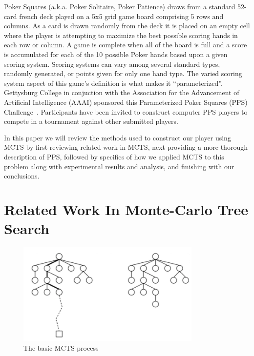 \documentclass[letterpaper]{article}
\begin{document}
Poker Squares (a.k.a. Poker Solitaire, Poker Patience) draws from a standard 52-card french deck played on a 5x5 grid game board comprising 5 rows and columns. As a card is drawn randomly from the deck it is placed on an empty cell where the player is attempting to maximize the best possible scoring hands in each row or column. A game is complete when all of the board is full and a score is accumulated for each of the 10 possible Poker hands based upon a given scoring system. Scoring systems can vary among several standard types, randomly generated, or points given for only one hand type. The varied scoring system aspect of this game's definition is what makes it ``parameterized''. Gettysburg College in conjuction with the Association for the Advancement of Artificial Intelligence (AAAI) sponsored this Parameterized Poker Squares (PPS) Challenge~\cite{neller2014nsg}. Participants have been invited to construct computer PPS players to compete in a  tournament against other submitted players.

In this paper we will review the methods used to construct our player using MCTS by first reviewing related work in MCTS, next providing a more thorough description of PPS, followed by specifics of how we applied MCTS to this problem along with experimental results and analysis, and finishing with our conclusions.

\section{Related Work In Monte-Carlo Tree Search}

\begin{figure}
\begin{center}
\includegraphics[width=.95\linewidth,height=2.0in]{images/basicprocess.png}
\end{center}
\caption{The basic MCTS process}
\label{fig:BASIC}
\end{figure}
\end{document}
